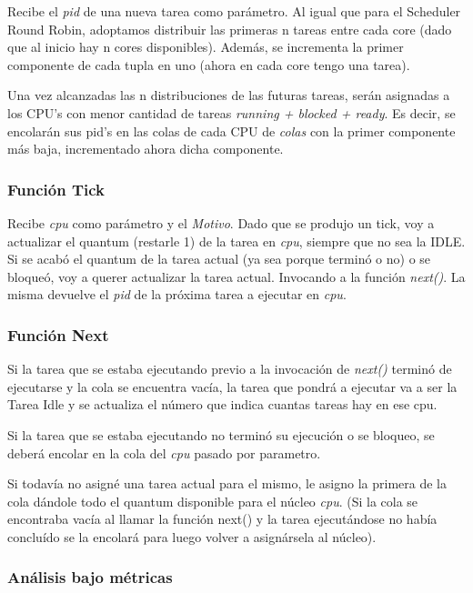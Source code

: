 \documentclass[a4paper]{article}
\begin{document}
Recibe el \emph{pid} de una nueva tarea como par\'ametro. Al igual que para el Scheduler Round Robin, adoptamos distribuir las primeras n tareas entre cada core (dado que al inicio hay n cores disponibles). Además, se incrementa la primer componente de cada tupla en uno (ahora en cada core tengo una tarea).

 Una vez alcanzadas las n distribuciones de las futuras tareas, ser\'an asignadas a los CPU's con menor cantidad de tareas \emph{running + blocked + ready}.  Es decir, se encolar\'an sus pid's en las colas de cada CPU de \emph{colas} con la primer componente más baja, incrementado ahora dicha componente.

\subsubsection*{Funci\'on Tick}	

Recibe \emph{cpu} como par\'ametro y el \emph{Motivo}. Dado que se produjo un tick, voy a actualizar el quantum (restarle 1) de la tarea en \emph{cpu}, siempre que no sea la IDLE. Si se acab\'o el quantum de la tarea actual (ya sea porque termin\'o o no) o se bloque\'o, voy a querer actualizar la tarea actual. Invocando a la funci\'on \emph{next()}. La misma devuelve el \emph{pid} de la próxima tarea a ejecutar en \emph{cpu}.

\subsubsection*{Funci\'on Next}	
	

Si la tarea que se estaba ejecutando previo a la invocaci\'on de \emph{next()} termin\'o de ejecutarse y la cola se encuentra vac\'ia, la tarea que pondr\'a a ejecutar va a ser la Tarea Idle y se actualiza el número que indica cuantas tareas hay en ese cpu.

Si la tarea que se estaba ejecutando no termin\'o su ejecuci\'on o se bloqueo, se deber\'a encolar en la cola del \emph{cpu} pasado por parametro.

Si todav\'ia no asign\'e una tarea actual para el mismo, le asigno la primera de la cola d\'andole todo el quantum disponible para el n\'ucleo \emph{cpu}. (Si la cola se encontraba vac\'ia al llamar la funci\'on next() y la tarea ejecut\'andose no hab\'ia conclu\'ido se la encolar\'a para luego volver a asign\'arsela al n\'ucleo).\\
 
\bigskip 
 
\subsubsection{An\'alisis bajo m\'etricas} 
 
\end{document}
